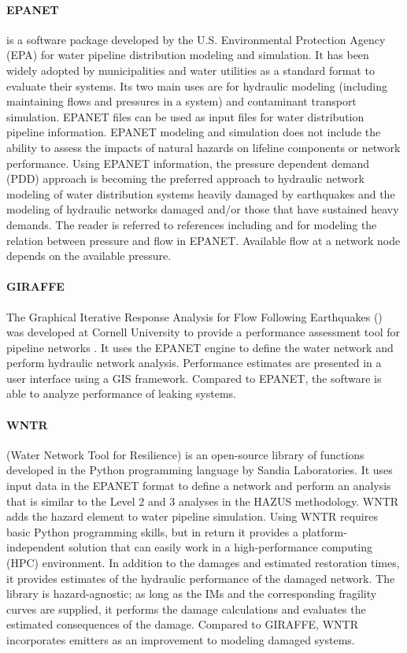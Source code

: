 \paragraph{EPANET}  is a software package developed by the U.S. Environmental Protection Agency (EPA) for water pipeline distribution modeling and simulation. It has been widely adopted by municipalities and water utilities as a standard format to evaluate their systems. Its two main uses are for hydraulic modeling (including maintaining flows and pressures in a system) and contaminant transport simulation. EPANET files can be used as input files for water distribution pipeline information. EPANET modeling and simulation does not include the ability to assess the impacts of natural hazards on lifeline components or network performance. Using EPANET information, the pressure dependent demand (PDD) approach is becoming the preferred approach to hydraulic network modeling of water distribution systems heavily damaged by earthquakes and the modeling of hydraulic networks damaged and/or those that have sustained heavy demands. The reader is referred to references including \cite{jun2013iterative} and \cite{sayyed2014modelling} for modeling the relation between pressure and flow in EPANET. Available flow at a network node depends on the available pressure.

\paragraph{GIRAFFE} The Graphical Iterative Response Analysis for Flow Following Earthquakes () was developed at Cornell University to provide a performance assessment tool for pipeline networks \citep{wang2008seismic}. It uses the EPANET engine to define the water network and perform hydraulic network analysis. Performance estimates are presented in a user interface using a GIS framework. Compared to EPANET, the software is able to analyze performance of leaking systems.

\paragraph{WNTR}  (Water Network Tool for Resilience) is an open-source library of functions developed in the Python programming language by Sandia Laboratories. It uses input data in the EPANET format to define a network and perform an analysis that is similar to the Level 2 and 3 analyses in the HAZUS methodology. WNTR adds the hazard element to water pipeline simulation. Using WNTR requires basic Python programming skills, but in return it provides a platform-independent solution that can easily work in a high-performance computing (HPC) environment. In addition to the damages and estimated restoration times, it provides estimates of the hydraulic performance of the damaged network. The library is hazard-agnostic; as long as the IMs and the corresponding fragility curves are supplied, it performs the damage calculations and evaluates the estimated consequences of the damage. Compared to GIRAFFE, WNTR incorporates emitters as an improvement to modeling damaged systems.

